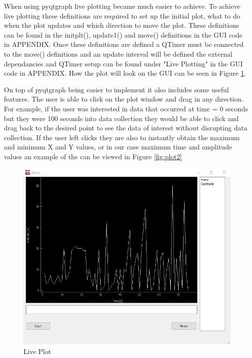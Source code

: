 When using pyqtgraph live plotting became much easier to achieve. To achieve live plotting three definitions are required to set up the initial plot, what to do when the plot updates and which direction to move the plot. These definitions can be found in the initplt(), update1() and move() definitions in the GUI code in APPENDIX. Once these definitions are defined a QTimer must be connected to the move() definitions and an update interval will be defined the external dependancies and QTimer setup can be found under "Live Plotting" in the GUI code in APPENDIX. How the plot will look on the GUI can be seen in Figure \ref{fig:plt}.

On top of pyqtgraph being easier to implement it also includes some useful features. The user is able to click on the plot window and drag in any direction. For example, if the user was interested in data that occurred at time = 0 seconds but they were 100 seconds into data collection they would be able to click and drag back to the desired point to see the data of interest without disrupting data collection. If the user left clicks they are also to instantly obtain the maximum and minimum X and Y values, or in our case maximum time and amplitude values an example of the can be viewed in Figure \ref{fig:plot2}
\begin{figure}[H]
	\includegraphics[width=\linewidth]{plot.png}
	\caption{Live Plot}
	\label{fig:plt}
\end{figure}
